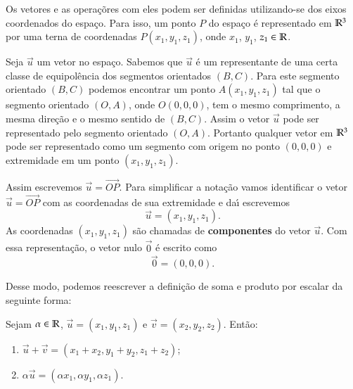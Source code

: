 Os vetores e as opera\c{c}\~ores com eles podem ser definidas utilizando-se dos eixos coordenados do espa\c{c}o. Para isso, um ponto $P$ do espa\c{c}o \'e representado em $\mathbb{R}^3$ por uma terna de coordenadas $P(x_1, y_1,z_1)$, onde $x_1$, $y_1$, $z_1 \in \mathbb{R}$.

Seja $\vec{u}$ um vetor no espa\c{c}o. Sabemos que $\vec{u}$ \'e um representante de uma certa classe de equipol\^encia dos segmentos orientados $(B,C)$. Para este segmento orientado $(B,C)$ podemos encontrar um ponto $A(x_1, y_1,z_1)$ tal que o segmento orientado $(O,A)$, onde $O(0,0,0)$, tem o mesmo comprimento, a mesma dire\c{c}\~ao e o mesmo sentido de $(B,C)$. Assim o vetor $\vec{u}$ pode ser representado pelo segmento orientado $(O,A)$. Portanto qualquer vetor em $\mathbb{R}^3$ pode ser representado como um segmento com origem no ponto $(0,0,0)$ e extremidade em um ponto $(x_1,y_1,z_1)$.


Assim escrevemos $\vec{u} = \vec{OP}$. Para simplificar a nota\c{c}\~ao vamos identificar o vetor $\vec{u} = \vec{OP}$ com as coordenadas de sua extremidade e da{\'\i} escrevemos
\[
  \vec{u} = (x_1,y_1,z_1).
\]
As coordenadas $(x_1,y_1,z_1)$ s\~ao chamadas de \textbf{componentes} do vetor $\vec{u}$. Com essa representa\c{c}\~ao, o vetor nulo $\vec{0}$ \'e escrito como
\[
  \vec{0} = (0,0,0).
\]

Desse modo, podemos reescrever a defini\c{c}\~ao de soma e produto por escalar da seguinte forma:
\begin{definicao}
  Sejam $\alpha \in \mathbb{R}$, $\vec{u} = (x_1, y_1,z_1)$ e $\vec{v} = (x_2, y_2,z_2)$. Ent\~ao:
  \begin{enumerate}
    \item $\vec{u} + \vec{v} = (x_1 + x_2, y_1 + y_2,z_1 + z_2)$;
    \item $\alpha \vec{u} = (\alpha x_1, \alpha y_1, \alpha z_1)$.
  \end{enumerate}
\end{definicao}


